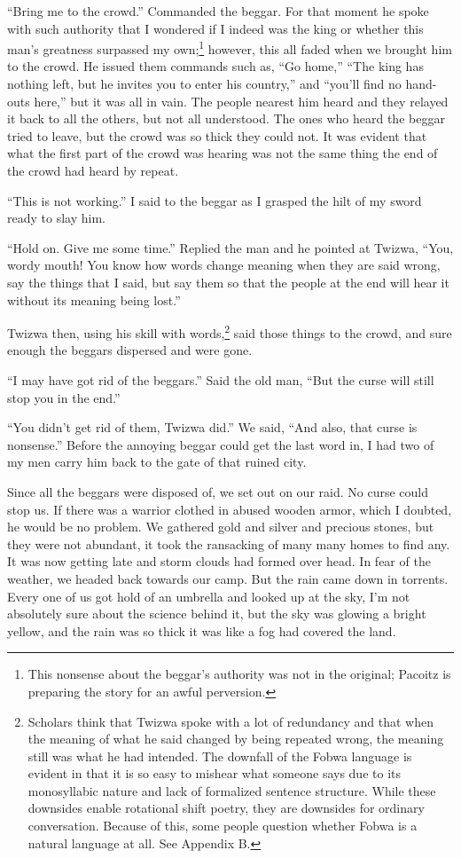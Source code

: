 \tbreak

``Bring me to the crowd.'' Commanded the beggar. For that moment he spoke with such authority that I wondered if I indeed was the king or whether this man's greatness surpassed my own;\footnote{This nonsense about the beggar's authority was not in the original; Pacoitz is preparing the story for an awful perversion.} however, this all faded when we brought him to the crowd.
He issued them commands such as, ``Go home,'' ``The king has nothing left, but he invites you to enter his country,'' and ``you'll find no hand-outs here,'' but it was all in vain. The people nearest him heard and they relayed it back to all the others, but not all understood. The ones who heard the beggar tried to leave, but the crowd was so thick they could not. It was evident that what the first part of the crowd was hearing was not the same thing the end of the crowd had heard by repeat.

``This is not working.'' I said to the beggar as I grasped the hilt of my sword ready to slay him.

``Hold on. Give me some time.'' Replied the man and he pointed at Twizwa, ``You, wordy mouth! You know how words change meaning when they are said wrong, say the things that I said, but say them so that the people at the end will hear it without its meaning being lost.''

Twizwa then, using his skill with words,\footnote{Scholars think that Twizwa spoke with a lot of redundancy and that when the meaning of what he said changed by being repeated wrong, the meaning still was what he had intended. The downfall of the Fo\-bwa language is evident in that it is so easy to mishear what someone says due to its monosyllabic nature and lack of formalized sentence structure. While these downsides enable rotational shift poetry, they are downsides for ordinary conversation. Because of this, some people question whether Fobwa is a natural language at all. See Appendix B.} said those things to the crowd, and sure enough the beggars dispersed and were gone.

``I may have got rid of the beggars.'' Said the old man, ``But the curse will still stop you in the end.''

``You didn't get rid of them, Twizwa did.'' We said, ``And also, that curse is nonsense.'' 
Before the annoying beggar could get the last word in, I had two of my men carry him back to the gate of that ruined city.

Since all the beggars were disposed of, we set out on our raid. No curse could stop us. If there was a warrior clothed in abused wooden armor, which I doubted, he would be no problem. We gathered gold and silver and precious stones, but they were not abundant, it took the ransacking of many many homes to find any. It was now getting late and storm clouds had formed over head. In fear of the weather, we headed back towards our camp. But the rain came down in torrents. Every one of us got hold of an umbrella and looked up at the sky, I'm not absolutely sure about the science behind it, but the sky was glowing a bright yellow, and the rain was so thick it was like a fog had covered the land.

